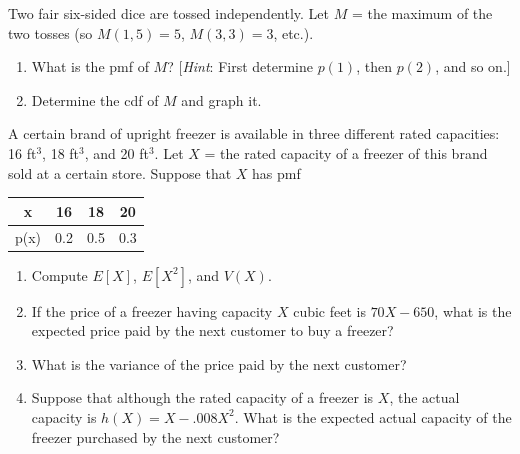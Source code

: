 \documentclass[11pt,letterpaper,boxed]{hmcpset}
\newcommand{\bk}[1]{\left[ #1 \right]}
\begin{document}
{\begin{solution}
	\vfill
\end{solution}
\newpage


\begin{problem}[3.2.18]
	Two fair six-sided dice are tossed independently. Let $M$ = the maximum of the two tosses (so $M(1,5) = 5$, $M(3,3) = 3$, etc.).
	\begin{enumerate}
		\item
			What is the pmf of $M$? [\textit{Hint}: First determine $p(1)$, then
$p(2)$, and so on.]
		\item
			Determine the cdf of $M$ and graph it.
	\end{enumerate}
\end{problem}

\begin{solution}
	\vfill
\end{solution}
\newpage


\begin{problem}[3.3.32]
	A certain brand of upright freezer is available in three different rated capacities: 16 ft$^3$, 18 ft$^3$, and 20 ft$^3$. Let $X$ = the rated capacity of a freezer of this brand sold at a certain store. Suppose that $X$ has pmf
	\begin{center}
		\begin{tabular}{c|c c c}
			x & 16 & 18 & 20\\
 			\hline
 			p(x) & 0.2 & 0.5 & 0.3 \\
	 	\end{tabular}
	\end{center}
	\begin{enumerate}
		\item
            Compute $E\bk{X}$, $E\bk{X^2}$, and $V(X)$.
		\item
			If the price of a freezer having capacity $X$ cubic feet is $70X - 650$, what is the expected price paid by the next customer to buy a freezer?
		\item
			What is the variance of the price paid by the next customer?
		\item
			Suppose that although the rated capacity of a freezer is $X$, the actual capacity is $h(X) = X - .008X^2$. What is the expected actual capacity of the freezer purchased by the next customer?
	\end{enumerate}
\end{problem}

}
\end{document}
